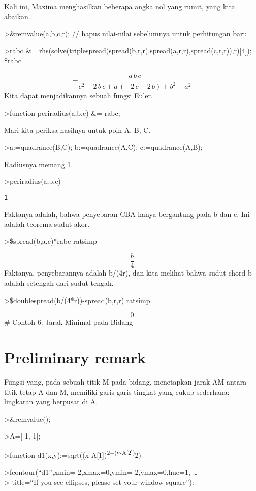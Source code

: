 \documentclass[
]{book}
\begin{document}
Kali ini, Maxima menghasilkan beberapa angka nol yang rumit, yang kita abaikan.

\textgreater\&remvalue(a,b,c,r); // hapus nilai-nilai sebelumnya untuk perhitungan baru

\textgreater rabc \&= rhs(solve(triplespread(spread(b,r,r),spread(a,r,r),spread(c,r,r)),r){[}4{]}); \$rabc

\[-\frac{a\,b\,c}{c^2-2\,b\,c+a\,\left(-2\,c-2\,b\right)+b^2+a^2}\]Kita dapat menjadikannya sebuah fungsi Euler.

\textgreater function periradius(a,b,c) \&= rabc;

Mari kita periksa hasilnya untuk poin A, B, C.

\textgreater a:=quadrance(B,C); b:=quadrance(A,C); c:=quadrance(A,B);

Radiusnya memang 1.

\textgreater periradius(a,b,c)

\begin{verbatim}
1
\end{verbatim}

Faktanya adalah, bahwa penyebaran CBA hanya bergantung pada b dan c. Ini adalah teorema sudut akor.

\textgreater\$spread(b,a,c)*rabc \textbar{} ratsimp

\[\frac{b}{4}\]Faktanya, penyebarannya adalah b/(4r), dan kita melihat bahwa sudut chord b adalah setengah dari sudut tengah.

\textgreater\$doublespread(b/(4*r))-spread(b,r,r) \textbar{} ratsimp

\[0\]\# Contoh 6: Jarak Minimal pada Bidang

\section{Preliminary remark}\label{preliminary-remark}

Fungsi yang, pada sebuah titik M pada bidang, menetapkan jarak AM antara titik tetap A dan M, memiliki garis-garis tingkat yang cukup sederhana: lingkaran yang berpusat di A.

\textgreater\&remvalue();

\textgreater A={[}-1,-1{]};

\textgreater function d1(x,y):=sqrt((x-A{[}1{]})\textsuperscript{2+(y-A{[}2{]})}2)

\textgreater fcontour(``d1'',xmin=-2,xmax=0,ymin=-2,ymax=0,hue=1, \ldots{}\\
\textgreater{} title=``If you see ellipses, please set your window square''):
\end{document}
